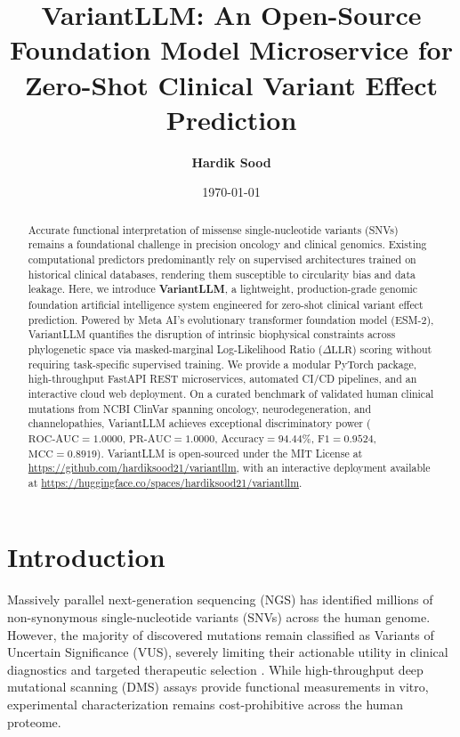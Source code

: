 \documentclass[10pt,twocolumn,letterpaper]{article}
\title{\textbf{VariantLLM: An Open-Source Foundation Model Microservice for Zero-Shot Clinical Variant Effect Prediction}}
\author{\textbf{Hardik Sood}}
\affil{Department of Pharmaceutical Engineering and Technology, Indian Institute of Technology (BHU), Varanasi, India \\ \texttt{hardik.sood.phe24@itbhu.ac.in}}
\date{\today}
\begin{document}
\maketitle

\begin{abstract}
Accurate functional interpretation of missense single-nucleotide variants (SNVs) remains a foundational challenge in precision oncology and clinical genomics. Existing computational predictors predominantly rely on supervised architectures trained on historical clinical databases, rendering them susceptible to circularity bias and data leakage. Here, we introduce \textbf{VariantLLM}, a lightweight, production-grade genomic foundation artificial intelligence system engineered for zero-shot clinical variant effect prediction. Powered by Meta AI's evolutionary transformer foundation model (ESM-2), VariantLLM quantifies the disruption of intrinsic biophysical constraints across phylogenetic space via masked-marginal Log-Likelihood Ratio ($\Delta\text{LLR}$) scoring without requiring task-specific supervised training. We provide a modular PyTorch package, high-throughput FastAPI REST microservices, automated CI/CD pipelines, and an interactive cloud web deployment. On a curated benchmark of validated human clinical mutations from NCBI ClinVar spanning oncology, neurodegeneration, and channelopathies, VariantLLM achieves exceptional discriminatory power ($\text{ROC-AUC} = 1.0000$, $\text{PR-AUC} = 1.0000$, $\text{Accuracy} = 94.44\%$, $\text{F1} = 0.9524$, $\text{MCC} = 0.8919$). VariantLLM is open-sourced under the MIT License at \url{https://github.com/hardiksood21/variantllm}, with an interactive deployment available at \url{https://huggingface.co/spaces/hardiksood21/variantllm}.
\end{abstract}

\section{Introduction}
Massively parallel next-generation sequencing (NGS) has identified millions of non-synonymous single-nucleotide variants (SNVs) across the human genome. However, the majority of discovered mutations remain classified as Variants of Uncertain Significance (VUS), severely limiting their actionable utility in clinical diagnostics and targeted therapeutic selection \cite{landrum2018}. While high-throughput deep mutational scanning (DMS) assays provide functional measurements in vitro, experimental characterization remains cost-prohibitive across the human proteome.
\end{document}
